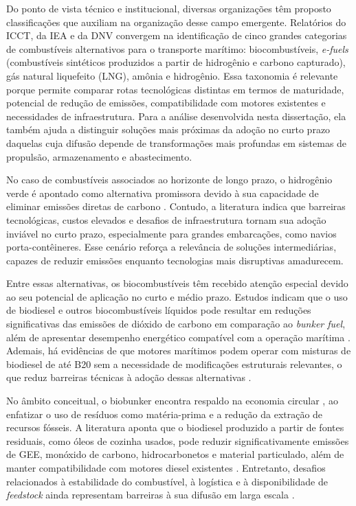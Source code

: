 Do ponto de vista técnico e institucional, diversas organizações têm proposto classificações que auxiliam na organização desse campo emergente. Relatórios do \gls{ICCT}, da \gls{IEA} e da \gls{DNV} convergem na identificação de cinco grandes categorias de combustíveis alternativos para o transporte marítimo: biocombustíveis, \emph{e-fuels} (combustíveis sintéticos produzidos a partir de hidrogênio e carbono capturado), gás natural liquefeito (\gls{LNG}), amônia e hidrogênio. Essa taxonomia é relevante porque permite comparar rotas tecnológicas distintas em termos de maturidade, potencial de redução de emissões, compatibilidade com motores existentes e necessidades de infraestrutura. Para a análise desenvolvida nesta dissertação, ela também ajuda a distinguir soluções mais próximas da adoção no curto prazo daquelas cuja difusão depende de transformações mais profundas em sistemas de propulsão, armazenamento e abastecimento.

No caso de combustíveis associados ao horizonte de longo prazo, o hidrogênio verde é apontado como alternativa promissora devido à sua capacidade de eliminar emissões diretas de carbono \citep{ustolin_extensive_2022}. Contudo, a literatura indica que barreiras tecnológicas, custos elevados e desafios de infraestrutura tornam sua adoção inviável no curto prazo, especialmente para grandes embarcações, como navios porta-contêineres. Esse cenário reforça a relevância de soluções intermediárias, capazes de reduzir emissões enquanto tecnologias mais disruptivas amadurecem.

Entre essas alternativas, os biocombustíveis têm recebido atenção especial devido ao seu potencial de aplicação no curto e médio prazo. Estudos indicam que o uso de biodiesel e outros biocombustíveis líquidos pode resultar em reduções significativas das emissões de dióxido de carbono em comparação ao \emph{bunker fuel}, além de apresentar desempenho energético compatível com a operação marítima \citep{kesieme_biofuel_2019,masum_comparing_2023,international_council_on_clean_transportation_potential_2021}. Ademais, há evidências de que motores marítimos podem operar com misturas de biodiesel de até B20 sem a necessidade de modificações estruturais relevantes, o que reduz barreiras técnicas à adoção dessas alternativas \citep{altarazi_effects_2022}.

No âmbito conceitual, o biobunker encontra respaldo na economia circular \citep{emaf_towards_2013}, ao enfatizar o uso de resíduos como matéria-prima e a redução da extração de recursos fósseis. A literatura aponta que o biodiesel produzido a partir de fontes residuais, como óleos de cozinha usados, pode reduzir significativamente emissões de \gls{GEE}, monóxido de carbono, hidrocarbonetos e material particulado, além de manter compatibilidade com motores diesel existentes \citep{lopresto_sustainable_2025}. Entretanto, desafios relacionados à estabilidade do combustível, à logística e à disponibilidade de \emph{feedstock} ainda representam barreiras à sua difusão em larga escala \citep{mohd_noor_biodiesel_2018}.

